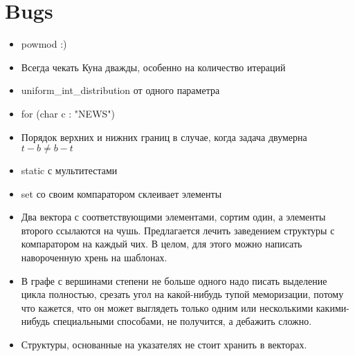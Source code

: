 \section{Bugs}

\begin{itemize}
    \item powmod :)

    \item Всегда чекать Куна дважды, особенно на количество итераций
    
    \item uniform\_int\_distribution от одного параметра
    
    \item for (char c : "NEWS")
    
    \item Порядок верхних и нижних границ в случае, когда задача двумерна
    $t - b \neq b - t$
    
    \item static с мультитестами

    \item set со своим компаратором склеивает элементы

    \item Два вектора с соответствующими элементами, сортим один, а элементы
    второго ссылаются на чушь. Предлагается лечить заведением структуры с
    компаратором на каждый чих. В целом, для этого можно написать навороченную
    хрень на шаблонах.

    \item В графе с вершинами степени не больше одного надо писать выделение
    цикла полностью, срезать угол на какой-нибудь тупой меморизации, потому
    что кажется, что он может выглядеть только одним или несколькими
    какими-нибудь специальными способами, не получится, а дебажить сложно.

	\item Структуры, основанные на указателях не стоит хранить в векторах.
\end{itemize}

